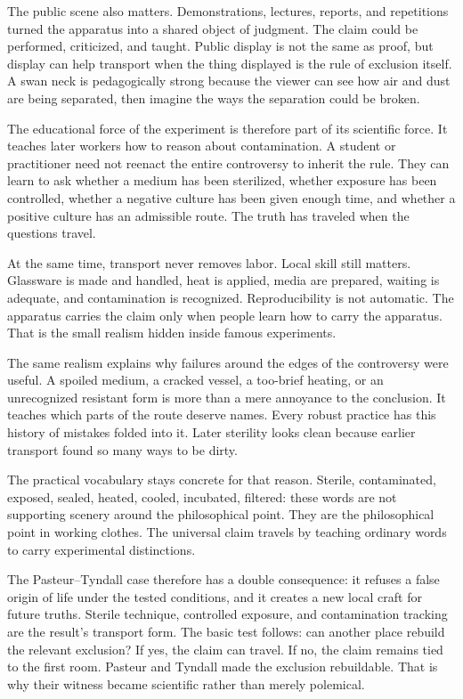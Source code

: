 The public scene also matters. Demonstrations, lectures, reports, and
repetitions turned the apparatus into a shared object of judgment. The
claim could be performed, criticized, and taught. Public display is not
the same as proof, but display can help transport when the thing
displayed is the rule of exclusion itself. A swan neck is pedagogically
strong because the viewer can see how air and dust are being separated,
then imagine the ways the separation could be broken.

The educational force of the experiment is therefore part of its
scientific force. It teaches later workers how to reason about
contamination. A student or practitioner need not reenact the entire
controversy to inherit the rule. They can learn to ask whether a medium
has been sterilized, whether exposure has been controlled, whether a
negative culture has been given enough time, and whether a positive
culture has an admissible route. The truth has traveled when the questions
travel.

At the same time, transport never removes labor. Local skill still
matters. Glassware is made and handled, heat is applied, media are
prepared, waiting is adequate, and contamination is recognized.
Reproducibility is not automatic. The apparatus carries the claim only
when people learn how to carry the apparatus. That is the small realism
hidden inside famous experiments.

The same realism explains why failures around the edges of the
controversy were useful. A spoiled medium, a cracked vessel, a too-brief
heating, or an unrecognized resistant form is more than a mere annoyance
to the conclusion. It teaches which parts of the route deserve names.
Every robust practice has this history of mistakes folded into it. Later
sterility looks clean because earlier transport found so many ways to be
dirty.

The practical vocabulary stays concrete for that reason. Sterile,
contaminated, exposed, sealed, heated, cooled, incubated, filtered:
these words are not supporting scenery around the philosophical point.
They are the philosophical point in working clothes. The universal claim
travels by teaching ordinary words to carry experimental distinctions.

The Pasteur--Tyndall case therefore has a double consequence: it refuses
a false origin of life under the tested conditions, and it creates a new
local craft for future truths. Sterile technique, controlled exposure,
and contamination tracking are the result's transport form. The basic
test follows: can another place rebuild the relevant exclusion? If yes,
the claim can travel. If no, the claim remains tied to the first room.
Pasteur and Tyndall made the exclusion rebuildable. That is why their
witness became scientific rather than merely polemical.

